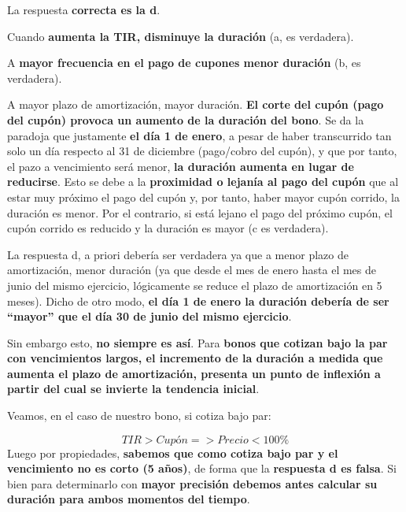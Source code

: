 \documentclass[
  letterpaper,
  DIV=11,
  numbers=noendperiod]{scrartcl}
\begin{document}
\begin{tcolorbox}[enhanced jigsaw, colframe=quarto-callout-note-color-frame, opacityback=0, colback=white, leftrule=.75mm, left=2mm, breakable, arc=.35mm, rightrule=.15mm, toprule=.15mm, bottomrule=.15mm]
\begin{minipage}[t]{5.5mm}
\textcolor{quarto-callout-note-color}{\faInfo}
\end{minipage}%
\begin{minipage}[t]{\textwidth - 5.5mm}

La respuesta \textbf{correcta es la d}.

Cuando \textbf{aumenta la TIR, disminuye la duración} (a, es verdadera).

A \textbf{mayor frecuencia en el pago de cupones menor duración} (b, es
verdadera).

A mayor plazo de amortización, mayor duración. \textbf{El corte del
cupón (pago del cupón) provoca un aumento de la duración del bono}. Se
da la paradoja que justamente \textbf{el día 1 de enero}, a pesar de
haber transcurrido tan solo un día respecto al 31 de diciembre
(pago/cobro del cupón), y que por tanto, el pazo a vencimiento será
menor, \textbf{la duración aumenta en lugar de reducirse}. Esto se debe
a la \textbf{proximidad o lejanía al pago del cupón} que al estar muy
próximo el pago del cupón y, por tanto, haber mayor cupón corrido, la
duración es menor. Por el contrario, si está lejano el pago del próximo
cupón, el cupón corrido es reducido y la duración es mayor (c es
verdadera).

La respuesta d, a priori debería ser verdadera ya que a menor plazo de
amortización, menor duración (ya que desde el mes de enero hasta el mes
de junio del mismo ejercicio, lógicamente se reduce el plazo de
amortización en 5 meses). Dicho de otro modo, \textbf{el día 1 de enero
la duración debería de ser ``mayor'' que el día 30 de junio del mismo
ejercicio}.

Sin embargo esto, \textbf{no siempre es así}. Para \textbf{bonos que
cotizan bajo la par con vencimientos largos, el incremento de la
duración a medida que aumenta el plazo de amortización, presenta un
punto de inflexión a partir del cual se invierte la tendencia inicial}.

Veamos, en el caso de nuestro bono, si cotiza bajo par:

\[TIR > Cupón => Precio < 100\%\] Luego por propiedades, \textbf{sabemos
que como cotiza bajo par y el vencimiento no es corto (5 años)}, de
forma que la \textbf{respuesta d es falsa}. Si bien para determinarlo
con \textbf{mayor precisión debemos antes calcular su duración para
ambos momentos del tiempo}.

\end{minipage}%
\end{tcolorbox}
\end{document}
